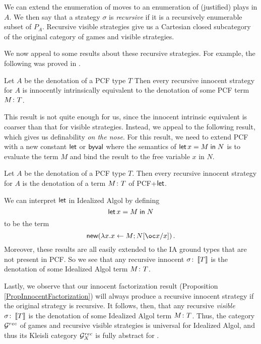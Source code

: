 \documentclass[11pt]{report}
\begin{document}
We can extend the enumeration of moves to an enumeration of (justified) plays in $A$.  
We then say that a strategy $\sigma$ is \emph{recursive} if it is a recursively enumerable subset of $P_A$.
Recursive visible strategies give us a Cartesian closed subcategory of the original category of games and visible strategies.

We now appeal to some results about these recursive strategies.  
For example, the following was proved in \cite{hoPcf}.

\begin{theorem}
  Let $A$ be the denotation of a PCF type $T$
  Then every recursive innocent strategy for $A$ is innocently intrinsically equivalent to the denotation of some PCF term $M\colon T$.
\end{theorem}

This result is not quite enough for us, since the innocent intrinsic equivalent is coarser than that for visible strategies.  
Instead, we appeal to the following result, which gives us definability \emph{on the nose}.  
For this result, we need to extend PCF with a new constant $\operatorname{\mathsf{let}}$ or $\operatorname{\mathsf{byval}}$ where the semantics of $\operatorname{\mathsf{let}} x = M\mathrel{\mathsf{in}} N$ is to evaluate the term $M$ and bind the result to the free variable $x$ in $N$.

\begin{theorem}
  Let $A$ be the denotation of a PCF type $T$.
  Then every recursive innocent strategy for $A$ is the denotation of a term $M\colon T$ of PCF+$\operatorname{\mathsf{let}}$.
\end{theorem}

We can interpret $\operatorname{\mathsf{let}}$ in Idealized Algol by defining
\[
  \operatorname{\mathsf{let}} x = M \mathrel{\mathsf{in}} N
  \]
to be the term
\[
  \neww (\lambda x. x\gets M;N[\oc x/x])\,.
  \]
Moreover, these results are all easily extended to the IA ground types that are not present in PCF.  
So we see that any recursive innocent $\sigma\colon \left\llbracket T\right\rrbracket$ is the denotation of some Idealized Algol term $M \colon T$.

Lastly, we observe that our innocent factorization result (Proposition \ref{PropInnocentFactorization}) will always produce a recursive innocent strategy if the original strategy is recursive.  
It follows, then, that any recursive \emph{visible} $\sigma\colon \left\llbracket T\right\rrbracket$ is the denotation of some Idealized Algol term $M \colon T$.
Thus, the category $\mathcal G^{rec}$ of games and recursive visible strategies is universal for Idealized Algol, and thus its Kleisli category $\mathcal G^{rec}_X$ is fully abstract for \IAX.
\end{document}

